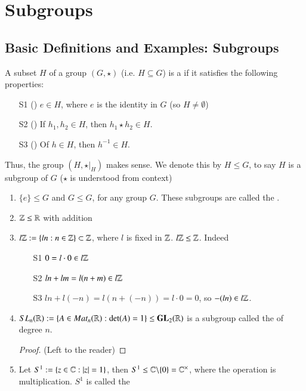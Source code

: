\documentclass[12pt, a4paper, oneside, openright, titlepage]{book}
\begin{document}
\chapter{\textsection\textsection Subgroups}

\section{\textsection Basic Definitions and Examples: Subgroups}

\begin{defn}
    A subset $H$ of a group $(G,\star)$ (i.e. $H \subseteq G$) is a  if it satisfies the following properties:
    \begin{enumerate}
        \item[S1] () $e \in H$, where $e$ is the identity in $G$ (so $H \neq \emptyset$)
        \item[S2] () If $h_1,h_2 \in H$, then $h_1\star h_2 \in H$.
        \item[S3] () Of $h \in H$, then $h^{-1} \in H$.
    \end{enumerate}
    Thus, the group $(H,\star\vert_{H})$ makes sense. We denote this by $H \leq G$, to say $H$ is a subgroup of $G$ ($\star$ is understood from context)
\end{defn}

\begin{eg}
    \leavevmode
    \begin{enumerate}
        \item $\{e\} \leq G$ and $G \leq G$, for any group $G$. These subgroups are called the .
        \item $\mathbb Z\leq \mathbb R$ with addition
        \item $l\mathbb Z := \{ln:n \in \mathbb Z\}\subset \mathbb Z$, where $l$ is fixed in $\mathbb Z$. $l\mathbb Z \leq \mathbb Z$. Indeed \begin{enumerate}
            \item[S1] $0 = l\cdot 0 \in l\mathbb Z$
            \item[S2] $ln+lm = l(n+m) \in l\mathbb Z$
            \item[S3] $ln + l(-n) = l(n+(-n)) = l\cdot 0 = 0$, so $-(ln) \in l\mathbb Z$.
        \end{enumerate}
        \item $SL_n(\mathbb R) := \{A \in Mat_n(\mathbb R):\det(A) = 1\} \leq \mathbf{GL}_2(\mathbb R)$ is a subgroup called the  of degree $n$.
        \begin{proof}
            (Left to the reader)
        \end{proof}
        \item Let $S^1 := \{z \in \mathbb C:|z| = 1\}$, then $S^1 \leq \mathbb C\backslash\{0\} = \mathbb C^{\times}$, where the operation is multiplication. $S^1$ is called the 
    \end{enumerate}
\end{eg}
\end{document}
